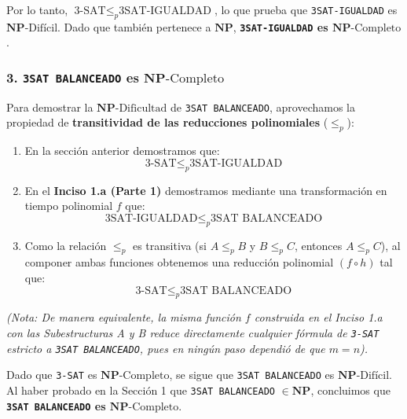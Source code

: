 Por lo tanto, $\text{3-SAT} \le_p \text{3SAT-IGUALDAD}$, lo que prueba que \texttt{3SAT-IGUALDAD} es $\mathbf{NP}\text{-Difícil}$. Dado que también pertenece a $\mathbf{NP}$, \textbf{\texttt{3SAT-IGUALDAD} es $\mathbf{NP}\text{-Completo}$}.

\subsubsection*{3. \texttt{3SAT BALANCEADO} es $\mathbf{NP}\text{-Completo}$}

Para demostrar la $\mathbf{NP}\text{-Dificultad}$ de \texttt{3SAT BALANCEADO}, aprovechamos la propiedad de \textbf{transitividad de las reducciones polinomiales} ($\le_p$):

\begin{enumerate}[label=\arabic*., leftmargin=*]
    \item En la sección anterior demostramos que:
    \[ \text{3-SAT} \le_p \text{3SAT-IGUALDAD} \]

    \item En el \textbf{Inciso 1.a (Parte 1)} demostramos mediante una transformación en tiempo polinomial $f$ que:
    \[ \text{3SAT-IGUALDAD} \le_p \text{3SAT BALANCEADO} \]

    \item Como la relación $\le_p$ es transitiva (si $A \le_p B$ y $B \le_p C$, entonces $A \le_p C$), al componer ambas funciones obtenemos una reducción polinomial $(f \circ h)$ tal que:
    \[ \text{3-SAT} \le_p \text{3SAT BALANCEADO} \]
\end{enumerate}

\textit{(Nota: De manera equivalente, la misma función $f$ construida en el Inciso 1.a con las Subestructuras A y B reduce directamente cualquier fórmula de \texttt{3-SAT} estricto a \texttt{3SAT BALANCEADO}, pues en ningún paso dependió de que $m = n$).}

Dado que \texttt{3-SAT} es $\mathbf{NP}\text{-Completo}$, se sigue que \texttt{3SAT BALANCEADO} es $\mathbf{NP}\text{-Difícil}$. Al haber probado en la Sección 1 que \texttt{3SAT BALANCEADO} $\in \mathbf{NP}$, concluimos que \textbf{\texttt{3SAT BALANCEADO} es $\mathbf{NP}\text{-Completo}$}.